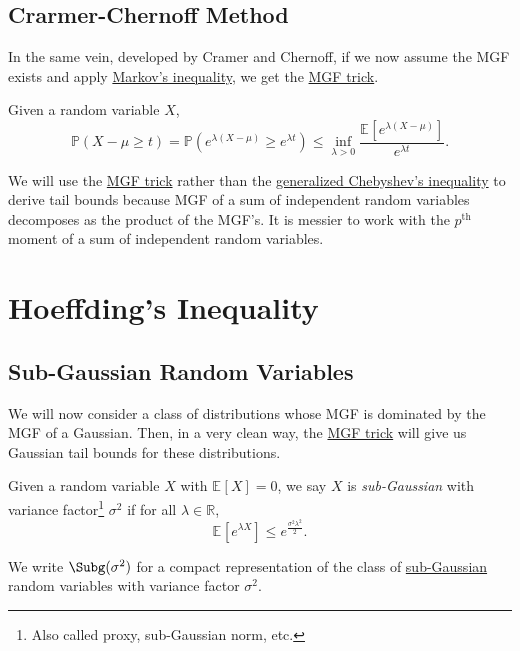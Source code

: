 \subsection{Crarmer-Chernoff Method}
In the same vein, developed by Cramer and Chernoff, if we now assume the MGF exists and apply \hyperref[lma:Markov-inequality]{Markov's inequality}, we get the \hyperref[lma:MGF-trick]{MGF trick}.

\begin{lemma}\label{lma:MGF-trick}
	Given a random variable \(X\),
	\[
		\mathbb{P} (X - \mu \geq t) = \mathbb{P} (e^{\lambda (X - \mu ) } \geq e^{\lambda t}) \leq \inf _{\lambda > 0} \frac{\mathbb{E}_{}\left[e^{\lambda (X - \mu )} \right] }{e^{\lambda t}}.
	\]
\end{lemma}

We will use the \hyperref[lma:MGF-trick]{MGF trick} rather than the \hyperref[lma:Chebyshev-inequality]{generalized Chebyshev's inequality} to derive tail bounds because MGF of a sum of independent random variables decomposes as the product of the MGF's. It is messier to work with the \(p^{\text{th} } \) moment of a sum of independent random variables.

\section{Hoeffding's Inequality}
\subsection{Sub-Gaussian Random Variables}
We will now consider a class of distributions whose MGF is dominated by the MGF of a Gaussian. Then, in a very clean way, the \hyperref[lma:MGF-trick]{MGF trick} will give us Gaussian tail bounds for these distributions.

\begin{definition}\label{def:sub-Gaussian}
	Given a random variable \(X\) with \(\mathbb{E}_{}\left[X \right] = 0\), we say \(X\) is \emph{sub-Gaussian} with variance factor\footnote{Also called proxy, sub-Gaussian norm, etc.} \(\sigma ^2\) if for all \(\lambda \in \mathbb{R} \),
	\[
		\mathbb{E}_{}\left[e^{\lambda X} \right] \leq e^{\frac{\sigma ^2 \lambda ^2}{2}}.
	\]
\end{definition}

\begin{notation}
	We write \(\Subg(\sigma ^{2} ) \) for a compact representation of the class of \hyperref[def:sub-Gaussian]{sub-Gaussian} random variables with variance factor \(\sigma ^{2} \).
\end{notation}

